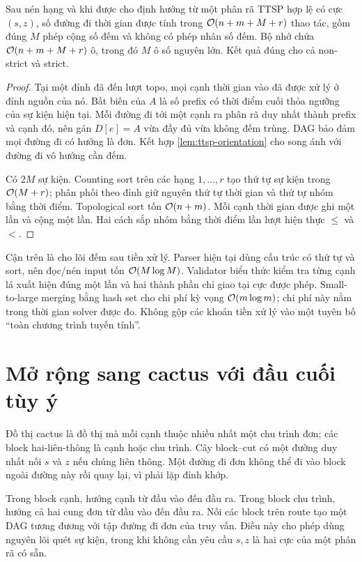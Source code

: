 \begin{theorem}
\label{thm:ttsp-events}
Sau nén hạng và khi được cho định hướng từ một phân rã TTSP hợp lệ có cực $(s,z)$, số đường đi thời gian được tính trong $\mathcal{O}(n+m+M+r)$ thao tác, gồm đúng $M$ phép cộng số đếm và không có phép nhân số đếm. Bộ nhớ chứa $\mathcal{O}(n+m+M+r)$ ô, trong đó $M$ ô số nguyên lớn. Kết quả đúng cho cả non-strict và strict.
\end{theorem}

\begin{proof}
Tại một đỉnh đã đến lượt topo, mọi cạnh thời gian vào đã được xử lý ở đỉnh nguồn của nó. Bất biến của $A$ là số prefix có thời điểm cuối thỏa ngưỡng của sự kiện hiện tại. Mỗi đường đi tới một cạnh ra phân rã duy nhất thành prefix và cạnh đó, nên gán $D[e]=A$ vừa đầy đủ vừa không đếm trùng. DAG bảo đảm mọi đường đi có hướng là đơn. Kết hợp \cref{lem:ttsp-orientation} cho song ánh với đường đi vô hướng cần đếm.

Có $2M$ sự kiện. Counting sort trên các hạng $1,\ldots,r$ tạo thứ tự sự kiện trong $\mathcal{O}(M+r)$; phân phối theo đỉnh giữ nguyên thứ tự thời gian và thứ tự nhóm bằng thời điểm. Topological sort tốn $\mathcal{O}(n+m)$. Mỗi cạnh thời gian được ghi một lần và cộng một lần. Hai cách sắp nhóm bằng thời điểm lần lượt hiện thực $\le$ và $<$.
\end{proof}

Cận trên là cho lõi đếm sau tiền xử lý. Parser hiện tại dùng cấu trúc có thứ tự và sort, nên đọc/nén input tốn $\mathcal{O}(M\log M)$. Validator biểu thức kiểm tra từng cạnh lá xuất hiện đúng một lần và hai thành phần chỉ giao tại cực được phép. Small-to-large merging bằng hash set cho chi phí kỳ vọng $\mathcal{O}(m\log m)$; chi phí này nằm trong thời gian solver được đo. Không gộp các khoản tiền xử lý vào một tuyên bố ``toàn chương trình tuyến tính''.

\section{Mở rộng sang cactus với đầu cuối tùy ý}

Đồ thị cactus là đồ thị mà mỗi cạnh thuộc nhiều nhất một chu trình đơn; các block hai-liên-thông là cạnh hoặc chu trình. Cây block--cut có một đường duy nhất nối $s$ và $z$ nếu chúng liên thông. Một đường đi đơn không thể đi vào block ngoài đường này rồi quay lại, vì phải lặp đỉnh khớp.

Trong block cạnh, hướng cạnh từ đầu vào đến đầu ra. Trong block chu trình, hướng cả hai cung đơn từ đầu vào đến đầu ra. Nối các block trên route tạo một DAG tương đương với tập đường đi đơn của truy vấn. Điều này cho phép dùng nguyên lõi quét sự kiện, trong khi không cần yêu cầu $s,z$ là hai cực của một phân rã có sẵn.

